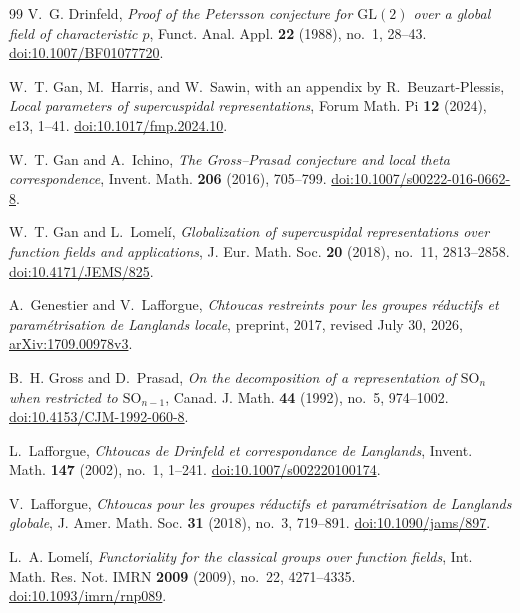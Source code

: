 \begin{thebibliography}{99}
V.~G. Drinfeld,
\emph{Proof of the Petersson conjecture for $\mathrm{GL}(2)$
over a global field of characteristic $p$},
Funct. Anal. Appl. \textbf{22} (1988), no.~1, 28--43.
\href{https://doi.org/10.1007/BF01077720}{doi:10.1007/BF01077720}.

W.~T. Gan, M.~Harris, and W.~Sawin, with an appendix by R.~Beuzart-Plessis,
\emph{Local parameters of supercuspidal representations},
Forum Math. Pi \textbf{12} (2024), e13, 1--41.
\href{https://doi.org/10.1017/fmp.2024.10}{doi:10.1017/fmp.2024.10}.

W.~T. Gan and A.~Ichino,
\emph{The Gross--Prasad conjecture and local theta correspondence},
Invent. Math. \textbf{206} (2016), 705--799.
\href{https://doi.org/10.1007/s00222-016-0662-8}{doi:10.1007/s00222-016-0662-8}.

W.~T. Gan and L.~Lomel\'i,
\emph{Globalization of supercuspidal representations over function fields
and applications},
J. Eur. Math. Soc. \textbf{20} (2018), no.~11, 2813--2858.
\href{https://doi.org/10.4171/JEMS/825}{doi:10.4171/JEMS/825}.

A.~Genestier and V.~Lafforgue,
\emph{Chtoucas restreints pour les groupes r\'eductifs et param\'etrisation
de Langlands locale},
preprint, 2017, revised July 30, 2026,
\href{https://arxiv.org/abs/1709.00978v3}{arXiv:1709.00978v3}.

B.~H. Gross and D.~Prasad,
\emph{On the decomposition of a representation of $\mathrm{SO}_n$
when restricted to $\mathrm{SO}_{n-1}$},
Canad. J. Math. \textbf{44} (1992), no.~5, 974--1002.
\href{https://doi.org/10.4153/CJM-1992-060-8}{doi:10.4153/CJM-1992-060-8}.

L.~Lafforgue,
\emph{Chtoucas de Drinfeld et correspondance de Langlands},
Invent. Math. \textbf{147} (2002), no.~1, 1--241.
\href{https://doi.org/10.1007/s002220100174}{doi:10.1007/s002220100174}.

V.~Lafforgue,
\emph{Chtoucas pour les groupes r\'eductifs et param\'etrisation
de Langlands globale},
J. Amer. Math. Soc. \textbf{31} (2018), no.~3, 719--891.
\href{https://doi.org/10.1090/jams/897}{doi:10.1090/jams/897}.

L.~A. Lomel\'i,
\emph{Functoriality for the classical groups over function fields},
Int. Math. Res. Not. IMRN \textbf{2009} (2009), no.~22, 4271--4335.
\href{https://doi.org/10.1093/imrn/rnp089}{doi:10.1093/imrn/rnp089}.


\end{thebibliography}
